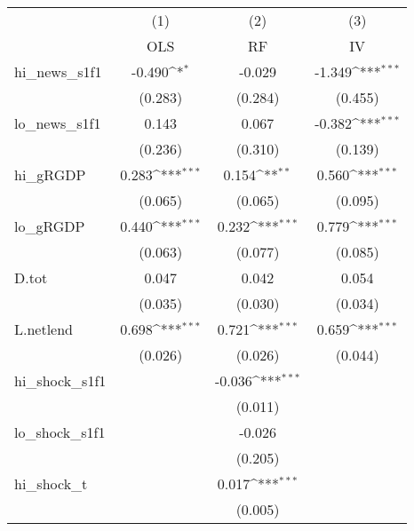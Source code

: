 {
\def\sym#1{\ifmmode^{#1}\else\(^{#1}\)\fi}
\begin{tabular}{l*{3}{c}}
\toprule
            &\multicolumn{1}{c}{(1)}&\multicolumn{1}{c}{(2)}&\multicolumn{1}{c}{(3)}\\
            &\multicolumn{1}{c}{OLS}&\multicolumn{1}{c}{RF}&\multicolumn{1}{c}{IV}\\
\midrule
hi\_news\_s1f1&      -0.490\sym{*}  &      -0.029         &      -1.349\sym{***}\\
            &     (0.283)         &     (0.284)         &     (0.455)         \\
\addlinespace
lo\_news\_s1f1&       0.143         &       0.067         &      -0.382\sym{***}\\
            &     (0.236)         &     (0.310)         &     (0.139)         \\
\addlinespace
hi\_gRGDP    &       0.283\sym{***}&       0.154\sym{**} &       0.560\sym{***}\\
            &     (0.065)         &     (0.065)         &     (0.095)         \\
\addlinespace
lo\_gRGDP    &       0.440\sym{***}&       0.232\sym{***}&       0.779\sym{***}\\
            &     (0.063)         &     (0.077)         &     (0.085)         \\
\addlinespace
D.tot       &       0.047         &       0.042         &       0.054         \\
            &     (0.035)         &     (0.030)         &     (0.034)         \\
\addlinespace
L.netlend   &       0.698\sym{***}&       0.721\sym{***}&       0.659\sym{***}\\
            &     (0.026)         &     (0.026)         &     (0.044)         \\
\addlinespace
hi\_shock\_s1f1&                     &      -0.036\sym{***}&                     \\
            &                     &     (0.011)         &                     \\
\addlinespace
lo\_shock\_s1f1&                     &      -0.026         &                     \\
            &                     &     (0.205)         &                     \\
\addlinespace
hi\_shock\_t  &                     &       0.017\sym{***}&                     \\
            &                     &     (0.005)         &                     \\

\end{tabular}}
